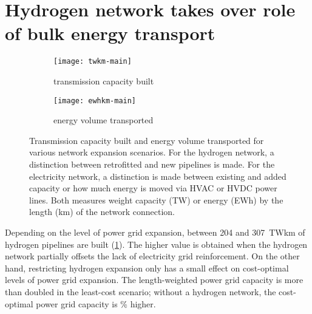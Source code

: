 \section*{Hydrogen network takes over role of bulk energy transport}
\label{sec:energy-moved}

\begin{figure}
    \centering
        \begin{subfigure}[t]{0.49\textwidth}
            \centering
            \caption{transmission capacity built}
            \texttt{[image: twkm-main]}
            \label{fig:network-stats:twkm}
        \end{subfigure}
        \begin{subfigure}[t]{0.49\textwidth}
            \centering
            \caption{energy volume transported}
            \texttt{[image: ewhkm-main]}
            \label{fig:network-stats:ewhkm}
        \end{subfigure}
    \caption{Transmission capacity built and energy volume transported for
        various network expansion scenarios. For the hydrogen network, a
        distinction between retrofitted and new pipelines is made. For the
        electricity network, a distinction is made between existing and added
        capacity or how much energy is moved via HVAC or HVDC power lines. Both
        measures weight capacity (TW) or energy (EWh) by the length (km) of the
        network connection.}
    \label{fig:network-stats}
\end{figure}


Depending on the level of power grid expansion, between 204 and
307~TWkm of hydrogen pipelines are built
(\cref{fig:network-stats:twkm}). The higher value is obtained when the hydrogen
network partially offsets the lack of electricity grid reinforcement. On the
other hand, restricting hydrogen expansion only has a small effect on
cost-optimal levels of power grid expansion. The length-weighted power grid
capacity is more than doubled in the least-cost scenario; without a hydrogen
network, the cost-optimal power grid capacity is \twkmhigher\% higher.


